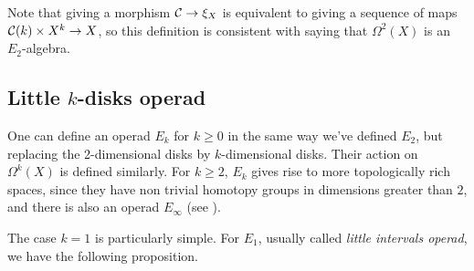 \documentclass[TFM.tex]{subfiles}
\begin{document}
Note that giving a morphism $\mathcal{C}\to \xi_X$ is equivalent to giving a sequence of maps $\mathcal{C}(k)\times X^k\to X$, so this definition is consistent with saying that $\Omega^2(X)$ is an $E_2$-algebra. 





%
\subsection{Little $k$-disks operad}\label{intervals}

One can define an operad $E_k$ for $k\geq 0$ in the same way we've defined $E_2$, but replacing the 2-dimensional disks by $k$-dimensional disks. Their action on $\Omega^k(X)$ is defined similarly. For $k\geq 2$, $E_k$ gives rise to more topologically rich spaces, since they have non trivial homotopy groups in dimensions greater than $2$, and there is also an operad $E_\infty$ (see \cite{cuentas}). 

The case $k=1$ is particularly simple. For $E_1$, usually called \emph{little intervals operad}, we have the following proposition.
\end{document}
